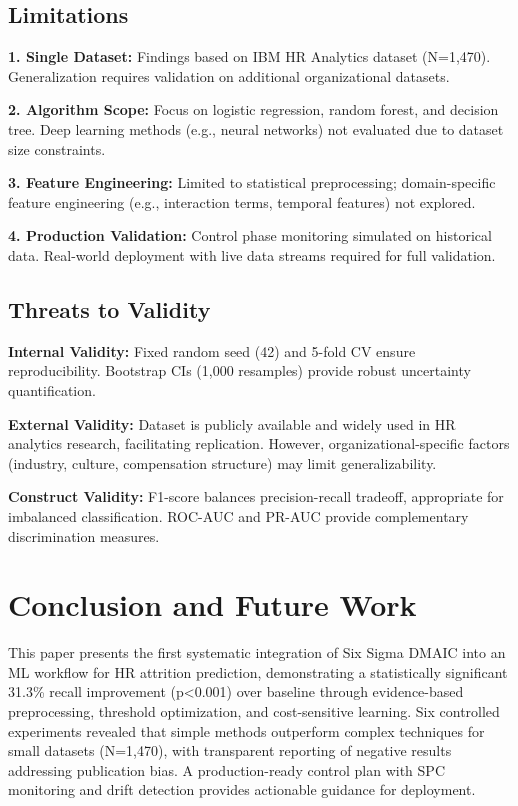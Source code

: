 \documentclass[conference]{IEEEtran}
\begin{document}
\subsection{Limitations}

\textbf{1. Single Dataset:} Findings based on IBM HR Analytics dataset (N=1,470). Generalization requires validation on additional organizational datasets.

\textbf{2. Algorithm Scope:} Focus on logistic regression, random forest, and decision tree. Deep learning methods (e.g., neural networks) not evaluated due to dataset size constraints.

\textbf{3. Feature Engineering:} Limited to statistical preprocessing; domain-specific feature engineering (e.g., interaction terms, temporal features) not explored.

\textbf{4. Production Validation:} Control phase monitoring simulated on historical data. Real-world deployment with live data streams required for full validation.

\subsection{Threats to Validity}

\textbf{Internal Validity:} Fixed random seed (42) and 5-fold CV ensure reproducibility. Bootstrap CIs (1,000 resamples) provide robust uncertainty quantification.

\textbf{External Validity:} Dataset is publicly available and widely used in HR analytics research, facilitating replication. However, organizational-specific factors (industry, culture, compensation structure) may limit generalizability.

\textbf{Construct Validity:} F1-score balances precision-recall tradeoff, appropriate for imbalanced classification. ROC-AUC and PR-AUC provide complementary discrimination measures.

\section{Conclusion and Future Work}

This paper presents the first systematic integration of Six Sigma DMAIC into an ML workflow for HR attrition prediction, demonstrating a statistically significant 31.3\% recall improvement (p<0.001) over baseline through evidence-based preprocessing, threshold optimization, and cost-sensitive learning. Six controlled experiments revealed that simple methods outperform complex techniques for small datasets (N=1,470), with transparent reporting of negative results addressing publication bias. A production-ready control plan with SPC monitoring and drift detection provides actionable guidance for deployment.
\end{document}
